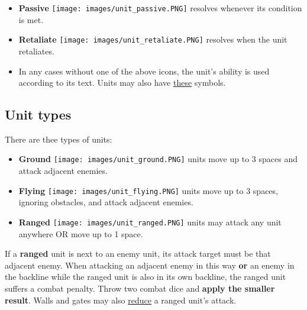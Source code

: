 \documentclass[12pt]{article}
\begin{document}
  \begin{minipage}{0.5\textwidth}
    \begin{itemize}[wide]
      \item\textbf{Passive} \texttt{[image: images/unit\_passive.PNG]} resolves whenever its condition is met.
      \item\textbf{Retaliate} \texttt{[image: images/unit\_retaliate.PNG]} resolves when the unit retaliates.
      \item In any cases without one of the above icons, the unit’s ability is used according to its text. Units may also have \hyperlink{Playerdecks}{these} symbols.
    \end{itemize}
  \end{minipage}

\clearpage
\subsection*{\hypertarget{Unittype}{Unit types}}
There are thee types of units:
\begin{itemize}
    \item \textbf{Ground} \texttt{[image: images/unit\_ground.PNG]} units move up to 3 spaces and attack adjacent enemies.
    \item \textbf{Flying} \texttt{[image: images/unit\_flying.PNG]} units move up to 3 spaces, ignoring obstacles, and attack adjacent enemies.
    \item \textbf{Ranged} \texttt{[image: images/unit\_ranged.PNG]} units may attack any unit anywhere OR move up to 1 space.
\end{itemize}
If a \textbf{ranged} unit is next to an enemy unit, its attack target must be that adjacent enemy. When attacking an adjacent enemy in this way \textbf{or} an enemy in the backline while the ranged unit is also in its own backline, the ranged unit suffers a combat penalty. Throw two combat dice and \textbf{apply the smaller result}. Walls and gates may also \hyperlink{Walls}{reduce} a ranged unit's attack.
\end{document}
